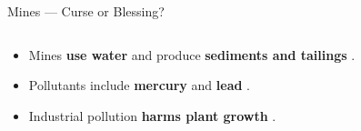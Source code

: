 \documentclass[aspectratio=169,11pt,dvipsnames, handout]{beamer}
\begin{document}
\begin{frame}{Mines — Curse or Blessing?}
\begin{columns}[t]
\begin{column}{0.45\textwidth}
\begin{itemize}
                \begin{itemize}
            \item Mines \textbf{use water} and produce \textbf{sediments and tailings} \parencite{moura2022}.
            \item Pollutants include \textbf{mercury} and \textbf{lead} \parencite{schwarzenbach2010}.
            \item Industrial pollution \textbf{harms plant growth} \parencite{Yang2021}.
        \end{itemize}
            \end{itemize}
        \end{column}
    \end{columns}
\end{frame}


\end{document}
